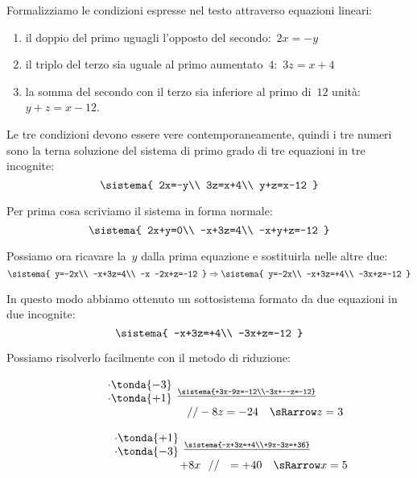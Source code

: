 \begin{soluzione}
Formalizziamo le condizioni espresse nel testo attraverso equazioni
lineari:

\begin{enumerate}[nosep]
\item il doppio del primo uguagli l'opposto del secondo:~\(2x=-y\)
\item il triplo del terzo sia uguale al primo aumentato~\(4\):~\(3z=x+4\)
\item la somma del secondo con il terzo sia inferiore al primo di~\(12\) 
unità:~\(y+z=x-12\).
\end{enumerate}

Le tre condizioni devono essere vere contemporaneamente, quindi i tre
numeri sono la terna soluzione del sistema di primo grado di tre equazioni in 
tre incognite:
\[\sistema{
  2x=-y\\
  3z=x+4\\
  y+z=x-12
}\]

Per prima cosa scriviamo il sistema in forma normale:
\[\sistema{
  2x+y=0\\
  -x+3z=4\\
  -x+y+z=-12
}\]

Possiamo ora ricavare la~\(y\) dalla prima equazione e sostituirla nelle 
altre 
due:
\[\sistema{
  y=-2x\\
  -x+3z=4\\
  -x -2x+z=-12
}
\Rightarrow
\sistema{
  y=-2x\\
  -x+3z=+4\\
  -3x+z=-12
}\]

In questo modo abbiamo ottenuto un sottosistema formato da due equazioni in 
due incognite:
\[\sistema{
  -x+3z=+4\\
  -3x+z=-12
}\]

Possiamo risolverlo facilmente con il metodo di riduzione:

\hspace{-20mm}
\begin{minipage}{.48\textwidth}
\[\stackrel{
  \begin{array}{l}\cdot \tonda{-3}\\ \cdot \tonda{+1}\end{array}
  \underline{\sistema{+3x-9z=-12\\-3x+~~z=-12}}}
  {\qquad \qquad \qquad \qquad \qquad 
   //  -8z  =-24 \quad \sRarrow z=3}\]
\end{minipage}
\begin{minipage}{.48\textwidth}
\[\stackrel{
  \begin{array}{l}\cdot \tonda{+1}\\ \cdot \tonda{-3}\end{array}
  \underline{\sistema{-x+3z=+4\\+9x-3z=+36}}}
  {\qquad \qquad \qquad \qquad 
   ~~~~~ +8x ~~ // ~~ =+40 \quad \sRarrow x=5}\]
\end{minipage}
\vspace{.5em}


\end{soluzione}

